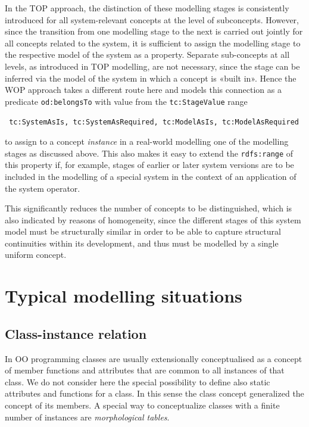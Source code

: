 \documentclass[11pt,a4paper]{article}
\begin{document}
In the TOP approach, the distinction of these modelling stages is consistently
introduced for all system-relevant concepts at the level of subconcepts.
However, since the transition from one modelling stage to the next is carried
out jointly for all concepts related to the system, it is sufficient to assign
the modelling stage to the respective model of the system as a property.
Separate sub-concepts at all levels, as introduced in TOP modelling, are not
necessary, since the stage can be inferred via the model of the system in
which a concept is «built in». Hence the WOP approach takes a different route
here and models this connection as a predicate \texttt{od:belongsTo} with
value from the \texttt{tc:StageValue} range
\begin{center}\tt
  tc:SystemAsIs, tc:SystemAsRequired, tc:ModelAsIs, tc:ModelAsRequired
\end{center}
to assign to a concept \emph{instance} in a real-world modelling one of the
modelling stages as discussed above.  This also makes it easy to extend the
\texttt{rdfs:range} of this property if, for example, stages of earlier or
later system versions are to be included in the modelling of a special system
in the context of an application of the system operator.

This significantly reduces the number of concepts to be distinguished, which
is also indicated by reasons of homogeneity, since the different stages of
this system model must be structurally similar in order to be able to capture
structural continuities within its development, and thus must be modelled by a
single uniform concept.

\section{Typical modelling situations}

\subsection{Class-instance relation}

In OO programming classes are usually extensionally conceptualised as a
concept of member functions and attributes that are common to all instances of
that class.  We do not consider here the special possibility to define also
static attributes and functions for a class.  In this sense the class concept
generalized the concept of its members.  A special way to conceptualize
classes with a finite number of instances are \emph{morphological tables}.
\end{document}
